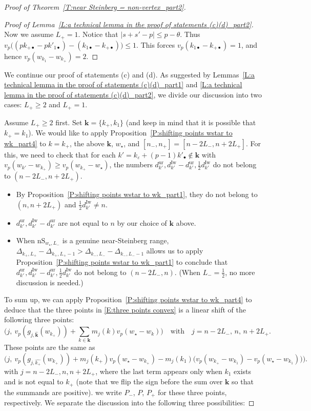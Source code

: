\documentclass[12pt]{amsart}
\theoremstyle{definition}
\numberwithin{equation}{subsection}
\def\bfk{\mathbf{k}}
\newcommand{\Iw}{\mathrm{Iw}}
\newcommand{\unr}{\mathrm{ur}}
\newcommand{\nS}{\mathrm{nS}}
\begin{document}
\begin{proof}[Proof of Theorem~\ref{T:near Steinberg = non-vertex_part2}]
\begin{proof}[Proof of Lemma~\ref{L:a technical lemma in the proof of statements (c)(d)_part2}]
Now we assume $L_+=1$. Notice that $|s+s'-p|\leq p-\theta$. Thus $v_p\big( (pk_{+\bullet}-pk'_{1\bullet}) - (k_{1\bullet} - k_{+\bullet})\big) \leq 1$. This forces $v_p(k_{1\bullet}-k_{+\bullet})= 1$,  and hence $v_p(w_{k_1}-w_{k_+})=2$.
		
\end{proof}
\medskip
We continue our proof of statements (c) and (d). As suggested by Lemmas~\ref{L:a technical lemma in the proof of statements (c)(d)_part1} and \ref{L:a technical lemma in the proof of statements (c)(d)_part2}, we divide our discussion into two cases: $L_+\geq 2$ and $L_+=1$. 

Assume $L_+\geq 2$ first.
Set $\bfk = \{k_+,k_1\}$ (and keep in mind that it is possible that $k_+=k_1$).
We would like to apply Proposition~\ref{P:shifting points wstar to wk_part4} to  $k = k_+$, the above $\bfk$, $w_\star$, and $[n_-, n_+] = [n-2L_-, n+2L_+]$. For this, we need to check that for each $k' = k_\varepsilon + (p-1)k'_\bullet \notin \bfk$ with $v_p(w_{k'}-w_{k_+}) \geq v_p(w_{k_+}-w_\star)$, the numbers $d_{k'}^\unr, d_{k'}^{\Iw}-d_{k'}^{\unr}, \frac 12d_{k'}^\Iw$ do not belong to $(n-2L_-, n+2L_+)$. 
\begin{itemize}
\item 
By Proposition~\ref{P:shifting points wstar to wk_part1}, they do not belong to $(n, n+2L_+)$ and $\frac 12d_{k'}^\Iw \neq n$.
\item
$d_{k'}^\unr, d_{k'}^{\Iw}-d_{k'}^{\unr}$ are not equal to $n$ by our choice of $\bfk$ above.
\item
When $\nS_{w_\star, L_-}$ is a genuine near-Steinberg range, $\Delta_{k_+, L_+} - \Delta_{k_+, L_+-1} > \Delta_{k_-, L_-} - \Delta_{k_-, L_--1}$ allows us to apply Proposition~\ref{P:shifting points wstar to wk_part1} to conclude that $d_{k'}^\unr, d_{k'}^{\Iw}-d_{k'}^{\unr}, \frac 12d_{k'}^\Iw$ do not belong to $(n-2L_-, n)$. 
(When $L_- = \frac 12$, no more discussion is needed.)
\end{itemize}

To sum up, we can apply Proposition~\ref{P:shifting points wstar to wk_part4} to deduce that the three points in \eqref{E:three points convex} is a linear 
shift of the following three points:
$$
\Big( j,\ v_p(g_{j, \hat{\bfk}}(w_{k_+})) + \sum_{k \in \bfk} m_j(k) v_p(w_\star-w_k)\Big)\quad \textrm{with} \quad j= n-2L_-,\,n,\, n+2L_+.
$$
These points are the same as
\begin{equation}
\label{E:vertex three points after shift}\Big( j,\ v_p(g_{j, \hat{ k_+}}(w_{k_+})) + m_j(k_+)v_p(w_\star-w_{k_+}) - m_j(k_1)\big(v_p(w_{k_+}-w_{k_1})- v_p(w_\star-w_{k_1})  \big)\Big).
\end{equation}
with $j = n-2L_-, n, n+2L_+$, where the last term appears only when $k_1$ exists and is not equal to $k_+$ (note that we flip the sign before the sum over $\bfk$ so that the summands are positive). we write $P_-$, $P$, $P_+$ for these three points, respectively.
We separate the discussion into the following three possibilities:


\end{proof}
\end{document}
